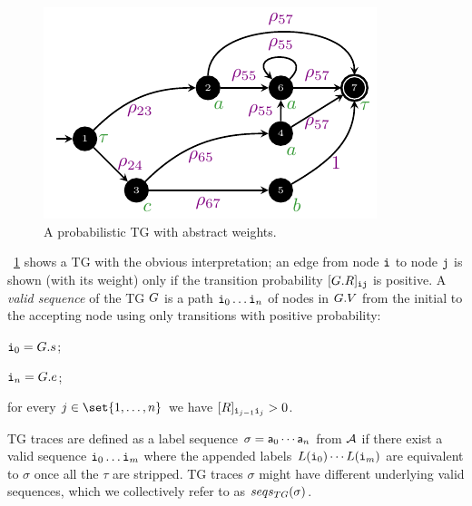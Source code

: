 \begin{figure}[!t]
	\begin{minipage}{.49\textwidth}\centering \includegraphics[width=.6\textwidth]{images/closed_example.pdf}
	\caption{A probabilistic TG with abstract weights.}\label{fig:lmc}
\end{minipage}
\end{figure}
%
\figurename~\ref{fig:lmc} shows a TG with the obvious interpretation; an edge from node $\textnormal{\texttt{i}}$ to node $\textnormal{\texttt{j}}$ is shown
(with its weight) only if the transition probability $[G.R]_{\textnormal{\texttt{i}}\textnormal{\texttt{j}}}$ is positive.
%
A \emph{valid sequence} of the TG $G$ is a path $\textnormal{\texttt{i}}_0\ldots\textnormal{\texttt{i}}_n$ of nodes in $G.V$ from the initial to the
accepting node using only transitions with positive probability:
\begin{inparaenum}[\it (i)]
\item $\textnormal{\texttt{i}}_0 = G.s$;
\item $\textnormal{\texttt{i}}_n = G.e$;
\item for every $j \in \set{1,\ldots,n}$ we have $[R]_{\textnormal{\texttt{i}}_{j-1}\textnormal{\texttt{i}}_{j}} > 0$.
\end{inparaenum}
TG traces are defined as a label sequence $\sigma=\mathsf{a}_0\cdots\mathsf{a}_n$ from $\mathcal{A}$ if there exist a valid sequence $\textnormal{\texttt{i}}_{0}\ldots\textnormal{\texttt{i}}_{m}$ where the appended labels $L(\textnormal{\texttt{i}}_{0})\cdots L(\textnormal{\texttt{i}}_{m})$ are equivalent to $\sigma$ once all the $\tau$ are stripped. TG traces $\sigma$ might have different underlying valid sequences, which we collectively refer to as $seqs_{TG}(\sigma)$.

